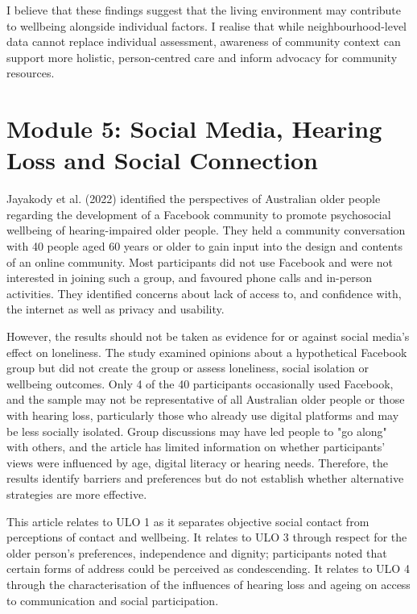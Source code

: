 \documentclass[12pt,a4paper]{article}
\begin{document}
I believe that these findings suggest that the living environment may contribute to wellbeing alongside individual factors. I realise that while neighbourhood-level data cannot replace individual assessment, awareness of community context can support more holistic, person-centred care and inform advocacy for community resources.

\section*{Module 5: Social Media, Hearing Loss and Social Connection}

Jayakody et al. (2022) identified the perspectives of Australian older people regarding the development of a Facebook community to promote psychosocial wellbeing of hearing-impaired older people. They held a community conversation with 40 people aged 60 years or older to gain input into the design and contents of an online community. Most participants did not use Facebook and were not interested in joining such a group, and favoured phone calls and in-person activities. They identified concerns about lack of access to, and confidence with, the internet as well as privacy and usability.

However, the results should not be taken as evidence for or against social media's effect on loneliness. The study examined opinions about a hypothetical Facebook group but did not create the group or assess loneliness, social isolation or wellbeing outcomes. Only 4 of the 40 participants occasionally used Facebook, and the sample may not be representative of all Australian older people or those with hearing loss, particularly those who already use digital platforms and may be less socially isolated. Group discussions may have led people to "go along" with others, and the article has limited information on whether participants' views were influenced by age, digital literacy or hearing needs. Therefore, the results identify barriers and preferences but do not establish whether alternative strategies are more effective.

This article relates to ULO 1 as it separates objective social contact from perceptions of contact and wellbeing. It relates to ULO 3 through respect for the older person's preferences, independence and dignity; participants noted that certain forms of address could be perceived as condescending. It relates to ULO 4 through the characterisation of the influences of hearing loss and ageing on access to communication and social participation. 
\end{document}
